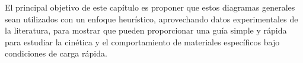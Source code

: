 \begin{table}[t]
    \centering
    \caption{Ejemplo de dos materiales, A y B, caracterizados por sus coeficientes 
    de difusión, sus constantes cinéticas y sus tamaños.}
    \setlength\extrarowheight{2pt}
    \label{t:ab}
\end{table}

El principal objetivo de este capítulo es proponer que estos diagramas generales 
sean utilizados con un enfoque heurístico, aprovechando datos experimentales de la
literatura, para mostrar que pueden proporcionar una guía simple y rápida para 
estudiar la cinética y el comportamiento de materiales específicos bajo 
condiciones de carga rápida.
